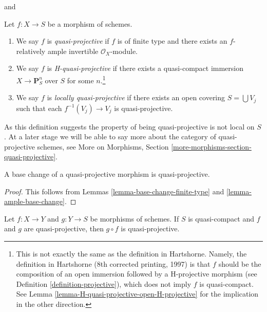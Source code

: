 \begin{definition}
\label{definition-quasi-projective}
\begin{reference}
\cite[II, Definition 5.3.1]{EGA} and \cite[page 103]{H}
\end{reference}
Let $f : X \to S$ be a morphism of schemes.
\begin{enumerate}
\item We say $f$ is {\it quasi-projective} if $f$ is of finite type
and there exists an $f$-relatively ample invertible $\mathcal{O}_X$-module.
\item We say $f$ is {\it H-quasi-projective} if there exists
a quasi-compact immersion $X \to \mathbf{P}^n_S$ over $S$ for some
$n$.\footnote{This is not exactly the same as the definition in Hartshorne.
Namely, the definition in Hartshorne (8th corrected printing, 1997) is that
$f$ should be the composition of an open immersion followed by a H-projective
morphism (see Definition \ref{definition-projective}), which does not imply
$f$ is quasi-compact. See
Lemma \ref{lemma-H-quasi-projective-open-H-projective} for
the implication in the other direction.}
\item We say $f$ is {\it locally quasi-projective} if there exists
an open covering $S = \bigcup V_j$ such that each $f^{-1}(V_j) \to V_j$
is quasi-projective.
\end{enumerate}
\end{definition}

\noindent
As this definition suggests the property of being quasi-projective
is not local on $S$. At a later stage we will be able to say more
about the category of quasi-projective schemes, see
More on Morphisms, Section \ref{more-morphisms-section-quasi-projective}.

\begin{lemma}
\label{lemma-base-change-quasi-projective}
A base change of a quasi-projective morphism is quasi-projective.
\end{lemma}

\begin{proof}
This follows from
Lemmas \ref{lemma-base-change-finite-type} and
\ref{lemma-ample-base-change}.
\end{proof}

\begin{lemma}
\label{lemma-composition-quasi-projective}
Let $f : X \to Y$ and $g : Y \to S$ be morphisms of schemes.
If $S$ is quasi-compact and $f$ and $g$ are quasi-projective,
then $g \circ f$ is quasi-projective.
\end{lemma}

